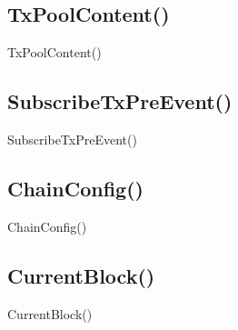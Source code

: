 \documentclass[letterpaper,10pt,english]{sphinxmanual}
\begin{document}
\subsection{TxPoolContent()}
\label{\detokenize{topics/implementation:txpoolcontent}}
TxPoolContent()


\subsection{SubscribeTxPreEvent()}
\label{\detokenize{topics/implementation:subscribetxpreevent}}
SubscribeTxPreEvent()


\subsection{ChainConfig()}
\label{\detokenize{topics/implementation:chainconfig}}
ChainConfig()


\subsection{CurrentBlock()}
\label{\detokenize{topics/implementation:currentblock}}
CurrentBlock()



\renewcommand{\indexname}{Index}
\printindex
\end{document}

